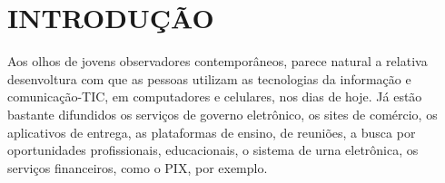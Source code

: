 \documentclass[
12pt,		%
openright,	%
twoside,  %
a4paper,			%
chapter=TITLE,		%
english,			%
french,				%
spanish,			%
brazil				%
]{USPSC-classe/USPSC}
\begin{document}






%




\listoffigures*
\cleardoublepage

\listoftables*
\cleardoublepage

\listofquadro*
\cleardoublepage




\tableofcontents*
\cleardoublepage
\textual

\chapter[INTRODU\c{C}\~AO]{INTRODU\c{C}\~AO}\label{INTRODU\c{C}\~AO}
Aos olhos de jovens observadores contempor\^aneos, parece natural a relativa desenvoltura com que as pessoas utilizam as tecnologias da informa\c{c}\~ao e comunica\c{c}\~ao-TIC, em computadores e celulares, nos dias de hoje. J\'a est\~ao bastante difundidos os servi\c{c}os de governo eletr\^onico, os sites de com\'ercio, os aplicativos de entrega, as plataformas de ensino, de reuni\~oes, a busca por oportunidades profissionais, educacionais, o sistema de urna eletr\^onica, os servi\c{c}os financeiros, como o PIX, por exemplo.
\end{document}
